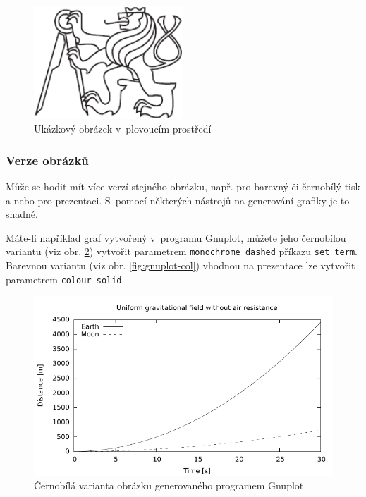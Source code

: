 \documentclass[thesis=B,czech]{FITthesis}[2012/10/20]
\begin{document}
\begin{figure}\centering
	\includegraphics[width=0.5\textwidth, angle=30]{cvut-logo-bw}
	\caption[Příklad obrázku]{Ukázkový obrázek v~plovoucím prostředí}\label{fig:float}
\end{figure}

\subsubsection{Verze obrázků}

Může se hodit mít více verzí stejného obrázku, např. pro barevný či černobílý tisk a nebo pro prezentaci. S~pomocí některých nástrojů na generování grafiky je to snadné.

Máte-li například graf vytvořený v~programu Gnuplot, můžete jeho černobílou variantu (viz obr. \ref{fig:gnuplot-bw}) vytvořit parametrem \verb|monochrome dashed| příkazu \verb|set term|. Barevnou variantu (viz obr. \ref{fig:gnuplot-col}) vhodnou na prezentace lze vytvořit parametrem \verb|colour solid|.

\begin{figure}\centering
	\includegraphics{gnuplot-bw}
	\caption[Gnuplot černobíle]{Černobílá varianta obrázku generovaného programem Gnuplot}\label{fig:gnuplot-bw}
\end{figure}
\end{document}
